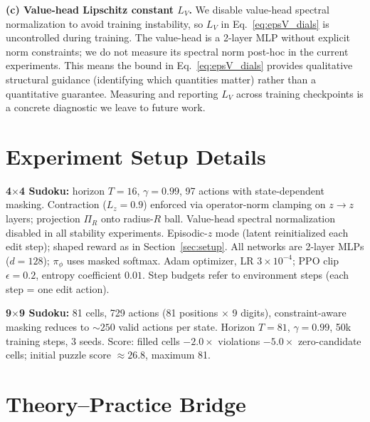 \documentclass{article}
\theoremstyle{plain}
\theoremstyle{definition}
\theoremstyle{remark}
\begin{document}
\textbf{(c) Value-head Lipschitz constant $L_V$.}
We disable value-head spectral normalization to avoid training instability, so $L_V$ in Eq.~\eqref{eq:epsV_dials} is uncontrolled during training.
The value-head is a 2-layer MLP without explicit norm constraints; we do not measure its spectral norm post-hoc in the current experiments.
This means the bound in Eq.~\eqref{eq:epsV_dials} provides qualitative structural guidance (identifying which quantities matter) rather than a quantitative guarantee.
Measuring and reporting $L_V$ across training checkpoints is a concrete diagnostic we leave to future work.

\section{Experiment Setup Details}
\label{app:exp_setup}

\textbf{4$\times$4 Sudoku:} horizon $T{=}16$, $\gamma{=}0.99$, 97 actions with state-dependent masking.
Contraction ($L_z{=}0.9$) enforced via operator-norm clamping on $z\!\to\!z$ layers; projection $\Pi_R$ onto radius-$R$ ball.
Value-head spectral normalization disabled in all stability experiments.
Episodic-$z$ mode (latent reinitialized each edit step); shaped reward as in Section~\ref{sec:setup}.
All networks are 2-layer MLPs ($d{=}128$); $\pi_\phi$ uses masked softmax.
Adam optimizer, LR $3{\times}10^{-4}$; PPO clip $\epsilon{=}0.2$, entropy coefficient $0.01$.
Step budgets refer to environment steps (each step = one edit action).

\textbf{9$\times$9 Sudoku:} 81 cells, 729 actions (81 positions $\times$ 9 digits), constraint-aware masking reduces to ${\sim}250$ valid actions per state.
Horizon $T{=}81$, $\gamma{=}0.99$, 50k training steps, 3 seeds.
Score: filled cells $- 2.0 \times$ violations $- 5.0 \times$ zero-candidate cells; initial puzzle score ${\approx}26.8$, maximum 81.

\section{Theory--Practice Bridge}
\label{app:theory_practice}
\end{document}
